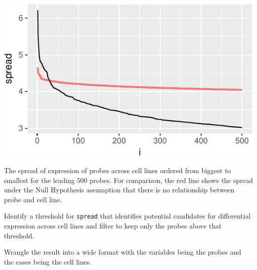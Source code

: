 \documentclass[]{tufte-handout}
\newenvironment{Shaded}{}{}
\newcommand{\KeywordTok}[1]{\textcolor[rgb]{0.00,0.44,0.13}{\textbf{{#1}}}}
\newcommand{\DataTypeTok}[1]{\textcolor[rgb]{0.56,0.13,0.00}{{#1}}}
\newcommand{\FloatTok}[1]{\textcolor[rgb]{0.25,0.63,0.44}{{#1}}}
\newcommand{\StringTok}[1]{\textcolor[rgb]{0.25,0.44,0.63}{{#1}}}
\newcommand{\NormalTok}[1]{{#1}}
\begin{document}
\begin{marginfigure}
\includegraphics{863-UnsupervisedGenetics_files/figure-latex/unnamed-chunk-9-1} \caption[The spread of expression of probes across cell lines ordered from biggest to smallest for the leading 500 probes]{The spread of expression of probes across cell lines ordered from biggest to smallest for the leading 500 probes. For comparison, the red line shows the spread under the Null Hypothesis assumption that there is no relationship between probe and cell line.}\label{fig:unnamed-chunk-9}
\end{marginfigure}

Identify a threshold for \texttt{spread} that identifies potential
candidates for differential expression across cell lines and filter to
keep only the probes above that threshold.

\begin{Shaded}
\end{Shaded}

Wrangle the result into a wide format with the variables being the
probes and the cases being the cell lines.

\begin{Shaded}
\end{Shaded}
\end{document}
